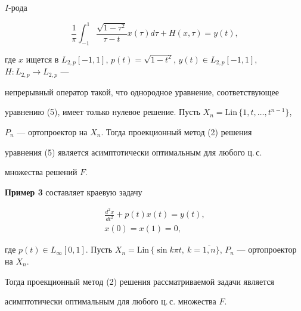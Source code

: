 $I$-рода


\begin{equation}


\frac{1}{\pi} \int_{-1}^1 \frac{\sqrt{ 1- \tau ^2}}{\tau -t}x(\tau)d


\tau+H(x, \tau)=y(t),


\end{equation}


где $x$ ищется в $L_{2,p}[-1,1]$, $p(t)= \sqrt{1-t^2}$, $y(t)


\in L_{2,p}[-1,1]$, $H:L_{2,p} \rightarrow L_{2,p}$ ---


непрерывный оператор такой, что однородное уравнение, соответствующее


уравнению (5), имеет только нулевое решение. Пусть $X_n=


\text{Lin}\, \{1, t , \dotsc , t^{n-1} \}$,


$P_n$ --- ортопроектор на $X_n$. Тогда проекционный метод (2) решения


уравнения (5) является асимптотически оптимальным для любого ц.\,с.


множества решений $F$.


\medskip





{\bf Пример 3} составляет краевую задачу


\begin{gather*}


\frac{d^2 x}{dt^2}+p(t)x(t)=y(t),\\


x(0)=x(1)=0,


\end{gather*}


где $p(t) \in L_{\infty }[0,1]$. Пусть $X_n=\text{Lin}\,\{ \sin k\pi


t,\ k=\overline{1,n} \}$, $P_n$ --- ортопроектор на $X_n$.


Тогда проекционный метод (2) решения рассматриваемой задачи является


асимптотически оптимальным для любого ц.\,с. множества $F$.





